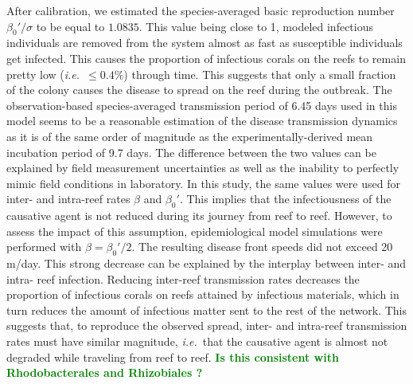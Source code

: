 \documentclass[utf8]{frontiersSCNS}
\newcommand{\ie}{{\it i.e.}\ }
\newcommand{\erinn}[1]{\textbf{\textcolor{green}{#1}}}
\begin{document}

After calibration, we estimated the species-averaged basic reproduction number $\beta_0'/\sigma$ to be equal to $1.0835$. This value being close to 1, modeled infectious individuals are removed from the system almost as fast as susceptible individuals get infected. This causes the proportion of infectious corals on the reefs to remain pretty low (\ie $\leq 0.4\%$) through time. This suggests that only a small fraction of the colony causes the disease to spread on the reef during the outbreak. The observation-based species-averaged transmission period of 6.45 days used in this model seems to be a reasonable estimation of the disease transmission dynamics as it is of the same order of magnitude as the experimentally-derived mean incubation period of 9.7 days. The difference between the two values can be explained by field measurement uncertainties as well as the inability to perfectly mimic field conditions in laboratory. In this study, the same values were used for inter- and intra-reef rates $\beta$ and $\beta_0'$. This implies that the infectiousness of the causative agent is not reduced during its journey from reef to reef. However, to assess the impact of this assumption, epidemiological model simulations were performed with $\beta=\beta_0'/2$. The resulting disease front speeds did not exceed 20 m/day. This strong decrease can be explained by the interplay between inter- and intra- reef infection. Reducing inter-reef transmission rates decreases the proportion of infectious corals on reefs attained by infectious materials, which in turn reduces the amount of infectious matter sent to the rest of the network. This suggests that, to reproduce the observed spread, inter- and intra-reef transmission rates must have similar magnitude, \ie that the causative agent is almost not degraded while traveling from reef to reef. \erinn{Is this consistent with Rhodobacterales and Rhizobiales ?}

\end{document}
